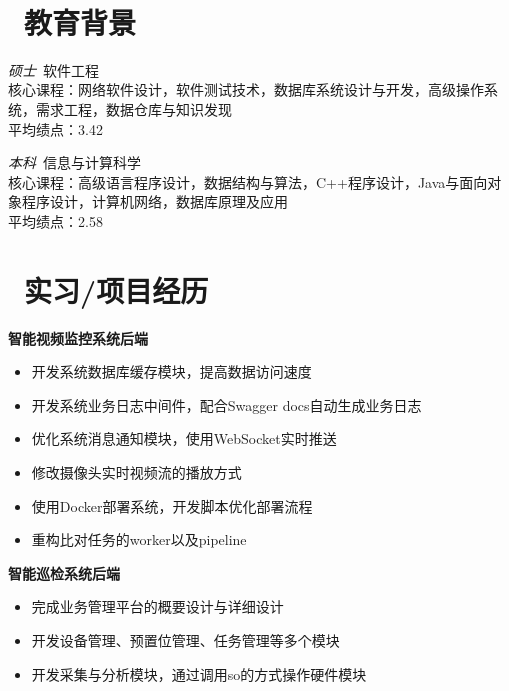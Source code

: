 \documentclass{resume}
\begin{document}


  \centerline { \textperiodcentered\ 
  }

\section{\faGraduationCap\ 教育背景}
\textit{硕士}\ 软件工程
\\核心课程：网络软件设计，软件测试技术，数据库系统设计与开发，高级操作系统，需求工程，数据仓库与知识发现
\\平均绩点：3.42

\textit{本科}\ 信息与计算科学
\\核心课程：高级语言程序设计，数据结构与算法，C++程序设计，Java与面向对象程序设计，计算机网络，数据库原理及应用
\\平均绩点：2.58

\section{\faBriefcase\ 实习/项目经历}
\textbf{智能视频监控系统后端}
\begin{itemize}
  \item 开发系统数据库缓存模块，提高数据访问速度
  \item 开发系统业务日志中间件，配合Swagger docs自动生成业务日志
  \item 优化系统消息通知模块，使用WebSocket实时推送
  \item 修改摄像头实时视频流的播放方式
  \item 使用Docker部署系统，开发脚本优化部署流程
  \item 重构比对任务的worker以及pipeline
\end{itemize}

\textbf{智能巡检系统后端}
\begin{itemize}
  \item 完成业务管理平台的概要设计与详细设计
  \item 开发设备管理、预置位管理、任务管理等多个模块
  \item 开发采集与分析模块，通过调用so的方式操作硬件模块
\end{itemize}
\end{document}
